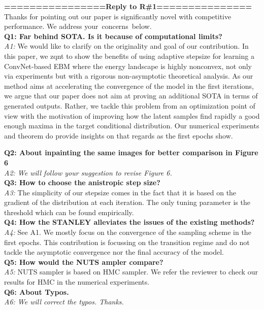 \documentclass{article}
\begin{document}
\textbf{================Reply to R\#1===============}\\
Thanks for pointing out our paper is significantly novel with competitive performance. We address your~concerns~below. \\
\textbf{Q1: Far behind SOTA. Is it because of computational limits?}\\
\textit{A1: }We would like to clarify on the originality and goal of our contribution. 
In this paper, we zqnt to show the benefits of using adaptive stepsize for learning a ConvNet-based EBM where the energy landscape is highly nonconvex, not only via experiments but with a rigorous non-asymptotic theoretical analysis.
As our method aims at accelerating the convergence of the model in the first iterations, we argue that our paper does not aim at proving an additional SOTA in terms of generated outputs. Rather, we tackle this problem from an optimization point of view with the motivation of improving how the latent samples find rapidly a good enough maxima in the target conditional distribution. Our numerical experiments and theorem do provide insights on that regards as the first epochs show.

\textbf{Q2: About inpainting the same images for better comparison in Figure 6}\\
\textit{A2: We will follow your suggestion to revise Figure 6.}\\

\textbf{Q3: How to choose the anistropic step size?}\\
\textit{A3:} The simplicity of our stepsize comes in the fact that it is based on the gradient of the distribution at each iteration. The only tuning parameter is the threshold which can be found empirically.\\
\textbf{Q4: How the STANLEY alleviates the issues of the existing methods?}\\
\textit{A4: } See A1. We mostly focus on the convergence of the sampling scheme in the first epochs. This contribution is focussing on the transition regime and do not tackle the asymptotic convergence nor the final accuracy of the model.\\
\textbf{Q5: How would the NUTS ampler compare?}\\
\textit{A5: } NUTS sampler is based on HMC sampler. We refer the reviewer to check our results for HMC in the numerical experiments.\\
\textbf{Q6: About Typos.}\\
\textit{A6: We will correct the typos. Thanks.}\\
\end{document}

